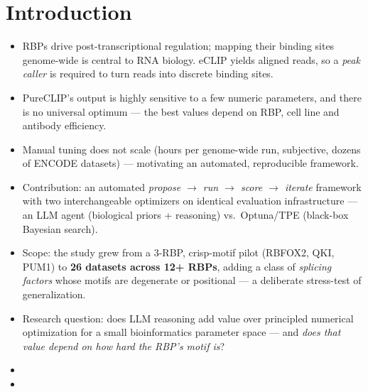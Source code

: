 \section{Introduction}
\label{introduction}

\begin{itemize}
  \item RBPs drive post-transcriptional regulation; mapping their binding sites genome-wide is central to RNA biology. eCLIP yields aligned reads, so a \emph{peak caller} is required to turn reads into discrete binding sites.
  \item PureCLIP's output is highly sensitive to a few numeric parameters, and there is no universal optimum --- the best values depend on RBP, cell line and antibody efficiency.
  \item Manual tuning does not scale (hours per genome-wide run, subjective, dozens of ENCODE datasets) --- motivating an automated, reproducible framework.
  \item Contribution: an automated \emph{propose $\rightarrow$ run $\rightarrow$ score $\rightarrow$ iterate} framework with two interchangeable optimizers on identical evaluation infrastructure --- an LLM agent (biological priors + reasoning) vs.\ Optuna/TPE (black-box Bayesian search).
  \item Scope: the study grew from a 3-RBP, crisp-motif pilot (RBFOX2, QKI, PUM1) to \textbf{26 datasets across 12+ RBPs}, adding a class of \emph{splicing factors} whose motifs are degenerate or positional --- a deliberate stress-test of generalization.
  \item Research question: does LLM reasoning add value over principled numerical optimization for a small bioinformatics parameter space --- and \emph{does that value depend on how hard the RBP's motif is}?
  \item {}
  \item {}
\end{itemize}


